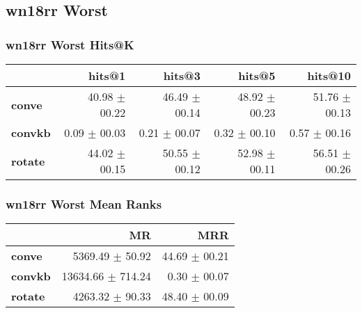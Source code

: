 \documentclass{article}
\begin{document}
\subsection{wn18rr Worst}
\subsubsection{wn18rr Worst Hits@K}
    \begin{center}
    \begin{tabular}{lrrrr}
\toprule
{} &         hits@1 &         hits@3 &         hits@5 &        hits@10 \\
\midrule
\textbf{conve } &  40.98 $\pm$ 00.22 &  46.49 $\pm$ 00.14 &  48.92 $\pm$ 00.23 &  51.76 $\pm$ 00.13 \\
\textbf{convkb} &   0.09 $\pm$ 00.03 &   0.21 $\pm$ 00.07 &   0.32 $\pm$ 00.10 &   0.57 $\pm$ 00.16 \\
\textbf{rotate} &  44.02 $\pm$ 00.15 &  50.55 $\pm$ 00.12 &  52.98 $\pm$ 00.11 &  56.51 $\pm$ 00.26 \\
\bottomrule
\end{tabular}

    \end{center}
\subsubsection{wn18rr Worst Mean Ranks}
    \begin{center}
    \begin{tabular}{lrr}
\toprule
{} &                 MR &            MRR \\
\midrule
\textbf{conve } &    5369.49 $\pm$ 50.92 &  44.69 $\pm$ 00.21 \\
\textbf{convkb} &  13634.66 $\pm$ 714.24 &   0.30 $\pm$ 00.07 \\
\textbf{rotate} &    4263.32 $\pm$ 90.33 &  48.40 $\pm$ 00.09 \\
\bottomrule
\end{tabular}

    \end{center}
\end{document}
